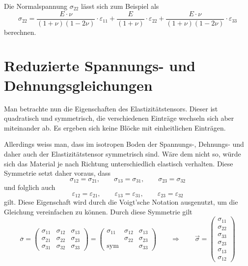 Die Normalspannung $\sigma_{22}$ lässt sich zum Beispiel als
\[
\sigma_{22}
=
\frac{E\cdot\nu}{(1+\nu)(1-2\nu)}\cdot\varepsilon_{11}+\frac{E}{(1+\nu)}\cdot\varepsilon_{22}+\frac{E\cdot\nu}{(1+\nu)(1-2\nu)}\cdot\varepsilon_{33}
\]
berechnen.

\section{Reduzierte Spannungs- und Dehnungsgleichungen}
Man betrachte nun die Eigenschaften des Elastizitätstensors.
Dieser ist quadratisch und symmetrisch, die verschiedenen Einträge wechseln sich aber miteinander ab.
Es ergeben sich keine Blöcke mit einheitlichen Einträgen.

Allerdings weiss man, dass im isotropen Boden der Spannungs-, Dehnungs- und daher auch der Elastizitätstensor symmetrisch sind.
Wäre dem nicht so, würde sich das Material je nach Richtung unterschiedlich elastisch verhalten.
Diese Symmetrie setzt daher voraus, dass
\[
\sigma_{12}
=
\sigma_{21}
,
\qquad
\sigma_{13}
=
\sigma_{31}
,
\qquad
\sigma_{23}
=
\sigma_{32}
\]
und folglich auch
\[
\varepsilon_{12}
=
\varepsilon_{21}
,
\qquad
\varepsilon_{13}
=
\varepsilon_{31}
,
\qquad
\varepsilon_{23}
=
\varepsilon_{32}
\]
gilt.
Diese Eigenschaft wird durch die Voigt'sche Notation \cite{spannung:Voigtsche-Notation} ausgenutzt, um die Gleichung vereinfachen zu können.
%
Durch diese Symmetrie gilt
\[
\overline{\sigma}
=
\begin{pmatrix}
	\sigma_{11} & \sigma_{12} & \sigma_{13} \\ 
	\sigma_{21} & \sigma_{22} & \sigma_{23} \\
	\sigma_{31} & \sigma_{32} & \sigma_{33}
\end{pmatrix}
=
\begin{pmatrix}
	\sigma_{11} & \sigma_{12} & \sigma_{13} \\ 
  	            & \sigma_{22} & \sigma_{23} \\
	 \text{sym} &             & \sigma_{33} 
\end{pmatrix}
\qquad
\Rightarrow
\qquad
\vec{\sigma}
=
\begin{pmatrix}
    \sigma_{11}\\
	\sigma_{22}\\
	\sigma_{33}\\
	\sigma_{23}\\
	\sigma_{13}\\
	\sigma_{12}
\end{pmatrix}
\]
